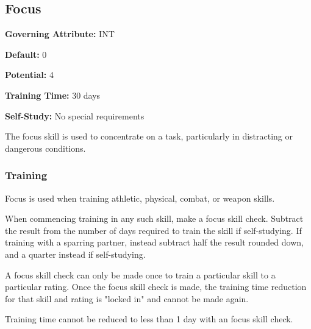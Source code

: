 \subsection{Focus}\label{skill:focus}

\noindent
\textbf{Governing Attribute:} INT

\noindent
\textbf{Default:} 0

\noindent
\textbf{Potential:} 4

\noindent
\textbf{Training Time:} 30 days

\noindent
\textbf{Self-Study:} No special requirements

The focus skill is used to concentrate on a task, particularly in distracting
or dangerous conditions.

\subsubsection*{Training}
Focus is used when training athletic, physical, combat, or weapon skills.

When commencing training in any such skill, make a
focus skill check. Subtract the result from the number of days required to
train the skill if self-studying. If training with a sparring partner, instead
subtract half the result rounded down, and a quarter instead if self-studying.

A focus skill check can only be made once to train a particular skill to a
particular rating. Once the focus skill check is made, the training time
reduction for that skill and rating is "locked in" and cannot be made again.

Training time cannot be reduced to less than 1 day with an focus skill
check.

